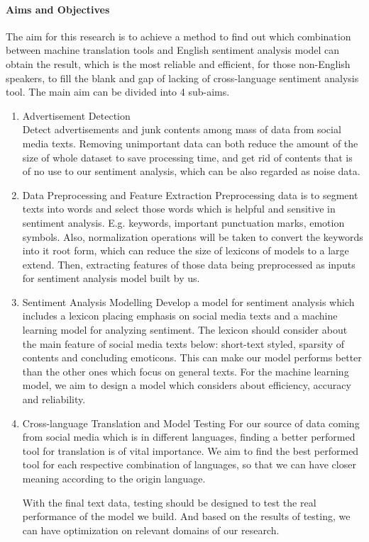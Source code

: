 \documentclass[conference]{IEEEtran}
\begin{document}
\paragraph{Aims and Objectives}
The aim for this research is to achieve a method to find out which combination
between machine translation tools and English sentiment analysis model can
obtain the result, which is the most reliable and efficient, for those
non-English speakers, to fill the blank and gap of lacking of cross-language
sentiment analysis tool.
The main aim can be divided into 4 sub-aims.
\begin{enumerate}
  \item Advertisement Detection \\
Detect advertisements and junk contents among mass of data from social media
texts. Removing unimportant data can both reduce the amount of the size of whole
dataset to save processing time, and get rid of contents that is of no use to
our sentiment analysis, which can be also regarded as noise data.
  \item Data Preprocessing and Feature Extraction
Preprocessing data is to segment texts into words and select those words which
is helpful and sensitive in sentiment analysis. E.g. keywords, important
punctuation marks, emotion symbols. Also, normalization operations will be taken
to convert the keywords into it root form, which can reduce the size of lexicons
of models to a large extend. Then, extracting features of those data being
preprocessed as inputs for sentiment analysis model built by us.
  \item Sentiment Analysis Modelling
Develop a model for sentiment analysis which includes a lexicon placing emphasis on social media texts and a machine learning model for analyzing sentiment.
The lexicon should consider about the main feature of social media texts below:
short-text styled, sparsity of contents and concluding emoticons. This can make
our model performs better than the other ones which focus on general texts.
For the machine learning model, we aim to design a model which considers about
efficiency, accuracy and reliability.
  \item Cross-language Translation and Model Testing
For our source of data coming from social media which is in different languages,
finding a better performed tool for translation is of vital importance. We aim
to find the best performed tool for each respective combination of languages, so
that we can have closer meaning according to the origin language.

With the final text data, testing should be designed to test the real
performance of the model we build. And based on the results of testing, we can
have optimization on relevant domains of our research.

\end{enumerate}
\end{document}
